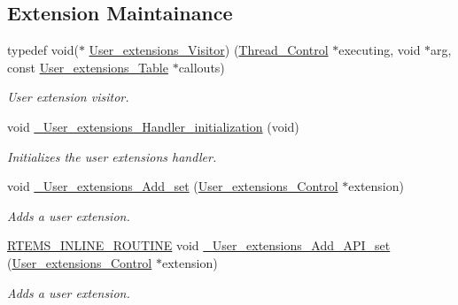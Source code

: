 \subsection*{Extension Maintainance}
\begin{DoxyCompactItemize}
\item 
typedef void($\ast$ \mbox{\hyperlink{group__RTEMSScoreUserExt_ga4f98f3e3ed809cbef39b59d326dc4a16}{User\+\_\+extensions\+\_\+\+Visitor}}) (\mbox{\hyperlink{struct__Thread__Control}{Thread\+\_\+\+Control}} $\ast$executing, void $\ast$arg, const \mbox{\hyperlink{structUser__extensions__Table}{User\+\_\+extensions\+\_\+\+Table}} $\ast$callouts)
\begin{DoxyCompactList}\small\item\em User extension visitor. \end{DoxyCompactList}\item 
\mbox{\label{group__RTEMSScoreUserExt_gac1791fb5fe3a1119a894a3847b0885ce}} 
void \mbox{\hyperlink{group__RTEMSScoreUserExt_gac1791fb5fe3a1119a894a3847b0885ce}{\+\_\+\+User\+\_\+extensions\+\_\+\+Handler\+\_\+initialization}} (void)
\begin{DoxyCompactList}\small\item\em Initializes the user extensions handler. \end{DoxyCompactList}\item 
void \mbox{\hyperlink{group__RTEMSScoreUserExt_gafdc6f52aa40887a25007f2c57a133a14}{\+\_\+\+User\+\_\+extensions\+\_\+\+Add\+\_\+set}} (\mbox{\hyperlink{structUser__extensions__Control}{User\+\_\+extensions\+\_\+\+Control}} $\ast$extension)
\begin{DoxyCompactList}\small\item\em Adds a user extension. \end{DoxyCompactList}\item 
\mbox{\hyperlink{group__RTEMSScoreBaseDefs_gac216239df231d5dbd15e3520b0b9313f}{R\+T\+E\+M\+S\+\_\+\+I\+N\+L\+I\+N\+E\+\_\+\+R\+O\+U\+T\+I\+NE}} void \mbox{\hyperlink{group__RTEMSScoreUserExt_gad235d2232b189b36c6ddc9068691ac9b}{\+\_\+\+User\+\_\+extensions\+\_\+\+Add\+\_\+\+A\+P\+I\+\_\+set}} (\mbox{\hyperlink{structUser__extensions__Control}{User\+\_\+extensions\+\_\+\+Control}} $\ast$extension)
\begin{DoxyCompactList}\small\item\em Adds a user extension. \end{DoxyCompactList}\item 

\end{DoxyCompactItemize}
